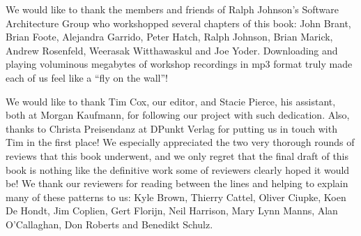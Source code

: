 \documentclass[a4paper,10pt,twoside]{book}
\begin{document}
We would like to thank the members and friends of Ralph Johnson's Software Architecture Group who workshopped several chapters of this book: John Brant, Brian Foote, Alejandra Garrido, Peter Hatch, Ralph Johnson, Brian Marick, Andrew Rosenfeld, Weerasak Witthawaskul and Joe Yoder. Downloading and playing voluminous megabytes of workshop recordings in mp3 format truly made each of us feel like a ``fly on the wall''!

We would like to thank Tim Cox, our editor, and Stacie Pierce, his assistant, both at Morgan Kaufmann, for following our project with such dedication. Also, thanks to Christa Preisendanz at DPunkt Verlag for putting us in touch with Tim in the first place! We especially appreciated the two very thorough rounds of reviews that this book underwent, and we only regret that the final draft of this book is nothing like the definitive work some of reviewers clearly hoped it would be! We thank our reviewers for reading between the lines and helping to explain many of these patterns to us: Kyle Brown, Thierry Cattel, Oliver Ciupke, Koen De Hondt, Jim Coplien, Gert Florijn, Neil Harrison, Mary Lynn Manns, Alan O'Callaghan, Don Roberts and Benedikt Schulz.

\ifx\wholebook\relax\else
   
   
   
\end{document}
